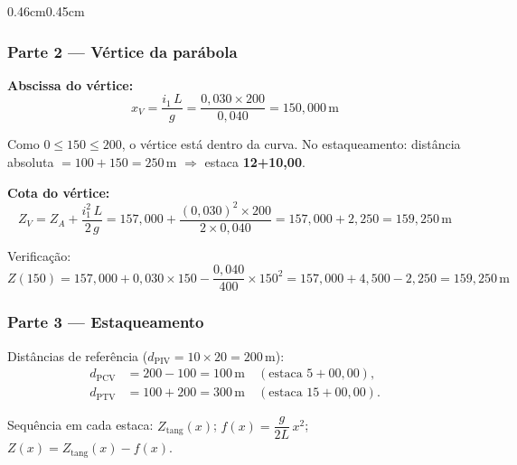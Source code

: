 \documentclass[12pt,letterpaper]{article}
\newenvironment{corpo}{\begin{adjustwidth}{0.46cm}{0.45cm}\justifying}{\end{adjustwidth}}
\begin{document}
\begin{corpo}
\subsubsection*{Parte 2 — Vértice da parábola}

\textbf{Abscissa do vértice:}
\[
  x_V = \frac{i_1\,L}{g} = \frac{0{,}030 \times 200}{0{,}040} = 150{,}000\,\text{m}
\]

Como $0 \le 150 \le 200$, o vértice está dentro da curva. No estaqueamento: distância absoluta $= 100 + 150 = 250\,\text{m}$ $\Rightarrow$ estaca \textbf{12+10,00}.

\textbf{Cota do vértice:}
\[
  Z_V = Z_A + \frac{i_1^2\,L}{2\,g} = 157{,}000 + \frac{(0{,}030)^2 \times 200}{2 \times 0{,}040} = 157{,}000 + 2{,}250 = 159{,}250\,\text{m}
\]

Verificação: $Z(150) = 157{,}000 + 0{,}030 \times 150 - \dfrac{0{,}040}{400} \times 150^2 = 157{,}000 + 4{,}500 - 2{,}250 = 159{,}250\,\text{m}$ \checkmark

\subsubsection*{Parte 3 — Estaqueamento}

Distâncias de referência ($d_{\mathrm{PIV}} = 10 \times 20 = 200\,\text{m}$):
\begin{align*}
  d_{\mathrm{PCV}} &= 200 - 100 = 100\,\text{m} \quad (\text{estaca }5{+}00{,}00),\\
  d_{\mathrm{PTV}} &= 100 + 200 = 300\,\text{m} \quad (\text{estaca }15{+}00{,}00).
\end{align*}

Sequência em cada estaca: $Z_{\mathrm{tang}}(x)$; $f(x) = \dfrac{g}{2L}\,x^2$; $Z(x) = Z_{\mathrm{tang}}(x) - f(x)$.


\end{corpo}
\end{document}
